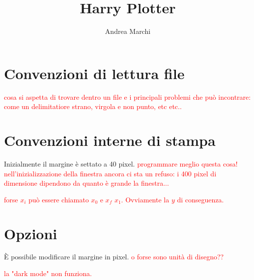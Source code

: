\documentclass[a4paper]{article}
\title{Harry Plotter}
\author{Andrea Marchi}
\begin{document}
\maketitle



\section{Convenzioni di lettura file}

\textcolor{red}{cosa si aspetta di trovare dentro un file e i principali problemi che può incontrare: come un delimitatiore strano, virgola e non punto, etc etc..}

\section{Convenzioni interne di stampa}


Inizialmente il margine è settato a 40 pixel. \textcolor{red}{programmare meglio questa cosa! nell'inizializzazione della finestra ancora ci sta un refuso: i 400 pixel di dimensione dipendono da quanto è grande la finestra...}

\textcolor{red}{forse $x_i$ può essere chiamato $x_0$ e $x_f$ $x_1$. Ovviamente la $y$ di conseguenza.}

\section{Opzioni}

È possibile modificare il margine in pixel. \textcolor{red}{o forse sono unità di disegno??}

\textcolor{red}{la "dark mode" non funziona.}
\end{document}
